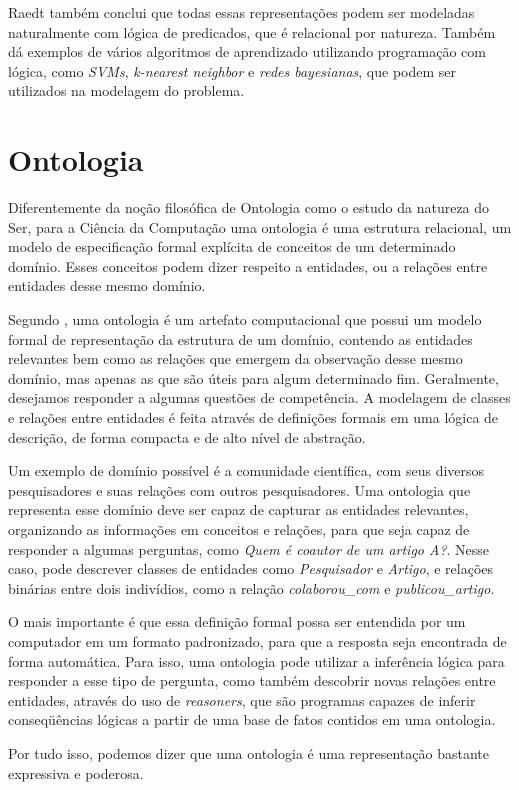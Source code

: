 Raedt também conclui que todas essas representações podem ser modeladas naturalmente com lógica de predicados, que é relacional por natureza. Também dá exemplos de vários algoritmos de aprendizado utilizando programação com lógica,
como \textit{SVMs}, \textit{k-nearest neighbor} e \textit{redes bayesianas}, que podem ser utilizados na modelagem do problema.

\section{Ontologia}
\label{sec:ontologia}

Diferentemente da noção filosófica de Ontologia como o estudo da natureza do Ser, para a Ciência da Computação uma ontologia é uma estrutura relacional, um modelo de especificação formal explícita de conceitos de um determinado domínio.
Esses conceitos podem dizer respeito a entidades, ou a relações entre entidades desse mesmo domínio.

Segundo \citet{Guarino2009}, uma ontologia é um artefato computacional que possui um modelo formal de representação da estrutura de um domínio, contendo as entidades relevantes bem como as relações que emergem da observação desse mesmo domínio, mas apenas as que são úteis para algum determinado fim. Geralmente, desejamos responder a algumas questões de competência. A modelagem de classes e relações entre entidades é feita através de definições formais em uma lógica de descrição, de forma compacta e de alto nível de abstração.

Um exemplo de domínio possível é a comunidade científica, com seus diversos pesquisadores e suas relações com outros pesquisadores. Uma ontologia que representa esse domínio deve ser capaz de capturar as entidades relevantes, organizando as informações em conceitos e relações, para que seja capaz de responder a algumas perguntas, como \textit{Quem é coautor de um artigo A?}. Nesse caso, pode descrever classes de entidades como \textit{Pesquisador} e \textit{Artigo}, e relações binárias entre dois indivídios, como a relação \textit{colaborou\_com} e \textit{publicou\_artigo}.

O mais importante é que essa definição formal possa ser entendida por um computador em um formato padronizado, para que a resposta seja encontrada de forma automática. Para isso, uma ontologia pode utilizar a inferência lógica para responder a esse tipo de pergunta, como também descobrir novas relações entre entidades, através do uso de \textit{reasoners}, que são programas capazes de inferir conseqüências lógicas a partir de uma base de fatos contidos em uma ontologia.

Por tudo isso, podemos dizer que uma ontologia é uma representação bastante expressiva e poderosa.


